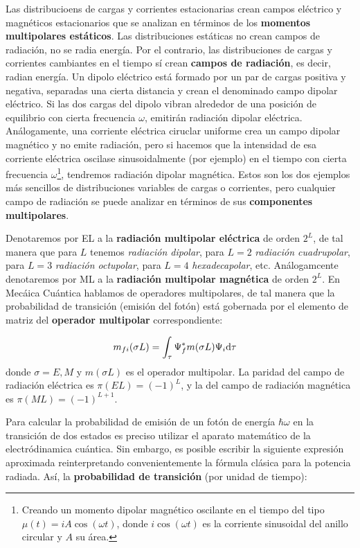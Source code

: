 Las distribucioens de cargas y corrientes estacionarias crean campos eléctrico y magnéticos estacionarios que se analizan en términos de los \textbf{momentos multipolares estáticos}. Las distribuciones estáticas no crean campos de radiación, no se radia energía. Por el contrario, las distribuciones de cargas y corrientes cambiantes en el  tiempo sí crean \textbf{campos de radiación}, es decir, radian energía. Un dipolo eléctrico está formado por un par de cargas positiva y negativa, separadas una cierta distancia y crean el denominado campo dipolar eléctrico. Si las dos cargas del dipolo vibran alrededor de una posición de equilibrio con cierta frecuencia $\omega$, emitirán radiación dipolar eléctrica. Análogamente, una corriente eléctrica ciruclar uniforme crea un campo dipolar magnético y no emite radiación, pero si hacemos que la intensidad de esa corriente eléctrica oscilase sinusoidalmente (por ejemplo) en el tiempo con cierta frecuencia $\omega$\footnote{Creando un momento dipolar magnético oscilante en el tiempo del tipo $\mu(t)=iA\cos (\omega t)$, donde $i\cos (\omega t)$ es la corriente sinusoidal del anillo circular y $A$ su área.}, tendremos radiación dipolar magnética. Estos son los dos ejemplos más sencillos de distribuciones variables de cargas o corrientes, pero cualquier campo de radiación se puede analizar en términos de sus \textbf{componentes multipolares}. 

Denotaremos por EL a la \textbf{radiación multipolar eléctrica} de orden $2^L$, de tal manera que para $L$ tenemos \textit{radiación dipolar}, para $L=2$ \textit{radiación cuadrupolar}, para $L=3$ \textit{radiación octupolar}, para $L=4$ \textit{hexadecapolar}, etc. Análogamcente denotaremos por ML a la \textbf{radiación multipolar magnética} de orden $2^L$. En Mecáica Cuántica hablamos de operadores multipolares, de tal manera que la probabilidad de transición (emisión del fotón) está gobernada por el elemento de matriz del \textbf{operador multipolar} correspondiente:

\begin{eqnarray}
	m_{fi} (\sigma L) = \int_\tau \Psi_f^* m(\sigma L) \Psi_i \mathrm{d} \tau \quad
\end{eqnarray}
donde $\sigma=E,M$  y $m(\sigma L)$ es el operador multipolar. La paridad del campo de radiación eléctrica es $\pi(EL)=(-1)^L$, y la del campo de radiación magnética es $\pi(ML)=(-1)^{L+1}$.


Para calcular la probabilidad de emisión de un fotón de energía $\hbar \omega$ en la transición de dos estados es preciso utilizar el aparato matemático de la electródinamica cuántica. Sin embargo, es posible escribir la siguiente expresión aproximada reinterpretando convenientemente la fórmula clásica para la potencia radiada. Así, la \textbf{probabilidad de transición} (por unidad de tiempo):

